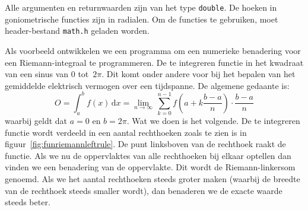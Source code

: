 Alle argumenten en returnwaarden zijn van het type \texttt{double}. De hoeken in goniometrische functies zijn in radialen. Om de functies te gebruiken, moet header-bestand \texttt{math.h} geladen worden.

Als voorbeeld ontwikkelen we een programma om een numerieke benadering voor een Riemann-integraal te programmeren. De te integreren functie in het kwadraat van een sinus van 0 tot~$2\pi$. Dit komt onder andere voor bij het bepalen van het gemiddelde elektrisch vermogen over een tijdspanne. De algemene gedaante is:
%
\begin{equation}
O = \int_{a}^{b}f(x)\,\mathrm{d}x = \lim\limits_{n\to\infty}\,\sum_{k=0}^{n-1}f\left(a+k\frac{b-a}{n}\right)\cdot\frac{b-a}{n}
\end{equation}
%
waarbij geldt dat $a=0$ en $b=2\pi$. Wat we doen is het volgende. De te integreren functie wordt verdeeld in een aantal rechthoeken zoals te zien is in figuur~\ref{fig:funriemannleftrule}. De punt linksboven van de rechthoek raakt de functie. Als we nu de oppervlaktes van alle rechthoeken bij elkaar optellen dan vinden we een benadering van de oppervlakte. Dit wordt de Riemann-linkersom genoemd. Als we het aantal rechthoeken steeds groter maken (waarbij de breedte van de rechthoek steeds smaller wordt), dan benaderen we de exacte waarde steeds beter.

